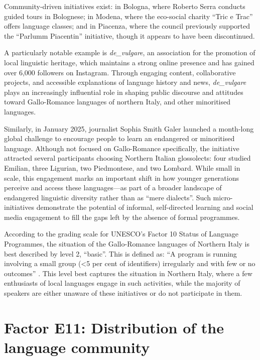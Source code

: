 \documentclass[a4paper,11pt]{article}
\begin{document}
Community-driven initiatives exist: in Bologna, where Roberto Serra conducts guided tours in Bolognese; in Modena, where the eco-social charity ``Tric e Trac'' offers language classes; and in Piacenza, where the council previously supported the ``Parlumm Piacentin'' initiative, though it appears to have been discontinued.  

A particularly notable example is \textit{de\_vulgare}, an association for the promotion of local linguistic heritage, which maintains a strong online presence and has gained over 6,000 followers on Instagram. Through engaging content, collaborative projects, and accessible explanations of language history and news, \textit{de\_vulgare} plays an increasingly influential role in shaping public discourse and attitudes toward Gallo-Romance languages of northern Italy, and other minoritised languages. 

Similarly, in January 2025, journalist Sophia Smith Galer launched a month-long global challenge to encourage people to learn an endangered or minoritised language. Although not focused on Gallo-Romance specifically, the initiative attracted several participants choosing Northern Italian glossolects: four studied Emilian, three Ligurian, two Piedmontese, and two Lombard. While small in scale, this engagement marks an important shift in how younger generations perceive and access these languages---as part of a broader landscape of endangered linguistic diversity rather than as ``mere dialects''. Such micro-initiatives demonstrate the potential of informal, self-directed learning and social media engagement to fill the gaps left by the absence of formal programmes.

According to the grading scale for UNESCO’s \citeyearpar{unesco2011} Factor 10 Status of Language Programmes, the situation of the Gallo-Romance languages of Northern Italy is best described by level 2, ``basic''. This is defined as: ``A program is running involving a small group (<5 per cent of identifiers) irregularly and with few or no outcomes'' \citep[6]{unesco2011}. This level best captures the situation in Northern Italy, where a few enthusiasts of local languages engage in such activities, while the majority of speakers are either unaware of these initiatives or do not participate in them.

\section{Factor E11: Distribution of the language community}
\end{document}
